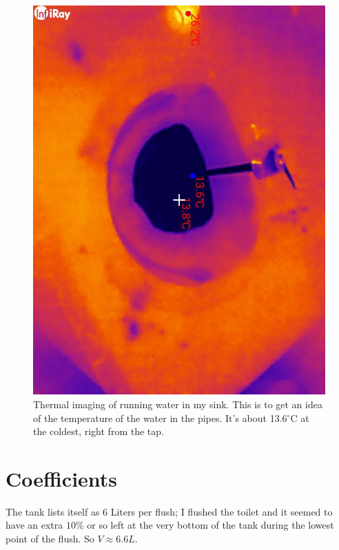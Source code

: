 \documentclass[12pt]{article}
\begin{document}
\begin{figure}
\begin{center}
    \includegraphics[angle=90,scale=0.2]{source_water_thermals.jpg}
    \caption{Thermal imaging of running water in my sink. This is to get an idea of the temperature of the water in the pipes. It's about 13.6$^\circ$C at the coldest, right from the tap.}
\end{center}
\end{figure}

\section*{Coefficients}
The tank lists itself as 6 Liters per flush; I flushed the toilet and it seemed to have an extra $10\%$ or so left at the very bottom of the tank during the lowest point of the flush. So $V \approx 6.6 L$.
\end{document}
